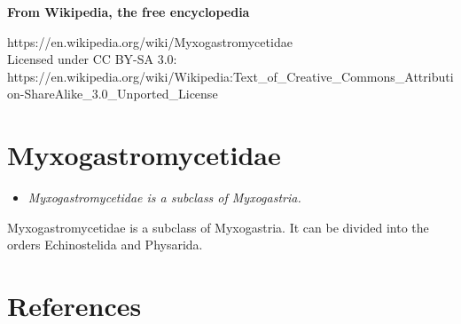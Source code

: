 \textbf{From Wikipedia, the free encyclopedia}

https://en.wikipedia.org/wiki/Myxogastromycetidae\\
Licensed under CC BY-SA 3.0:\\
https://en.wikipedia.org/wiki/Wikipedia:Text\_of\_Creative\_Commons\_Attribution-ShareAlike\_3.0\_Unported\_License

\section{Myxogastromycetidae}\label{myxogastromycetidae}

\begin{itemize}
\item
  \emph{Myxogastromycetidae is a subclass of Myxogastria.}
\end{itemize}

Myxogastromycetidae is a subclass of Myxogastria. It can be divided into
the orders Echinostelida and Physarida.

\section{References}\label{references}
